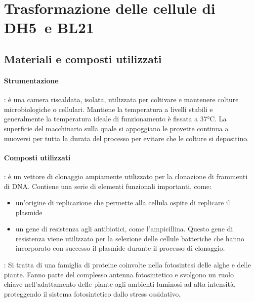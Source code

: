 \section{Trasformazione delle cellule di  DH5\textalpha\ e BL21}\label{sec:6}

\subsection{Materiali e composti utilizzati}
\paragraph{Strumentazione}
\begin{itemize}
	\itemb[Incubatore]: è una camera riscaldata, isolata, utilizzata per coltivare e mantenere colture microbiologiche o cellulari.	Mantiene la temperatura a livelli stabili e generalmente la temperatura ideale di funzionamento è fissata a 37°C. La superficie del macchinario sulla quale si appoggiano le provette continua a muoversi per tutta la durata del processo per evitare che le colture si depositino.
\end{itemize}
\paragraph{Composti utilizzati}
\begin{itemize}
	: è un vettore di clonaggio ampiamente utilizzato per la clonazione di frammenti di DNA. Contiene una serie di elementi funzionali importanti, come:
		\begin{itemize}[person]
			\item un'origine di replicazione che permette alla cellula ospite di replicare il plasmide
			\item un gene di resistenza agli antibiotici, come l'ampicillina. Questo gene di resistenza viene utilizzato per la selezione delle cellule batteriche che hanno incorporato con successo il plasmide durante il processo di clonaggio.
		\end{itemize}
	: Si tratta di una famiglia di proteine coinvolte nella fotosintesi delle alghe e delle piante. Fanno parte del complesso antenna fotosintetico e svolgono un ruolo chiave nell'adattamento delle piante agli ambienti luminosi ad alta intensità, proteggendo il sistema fotosintetico dallo stress ossidativo.
\end{itemize}


